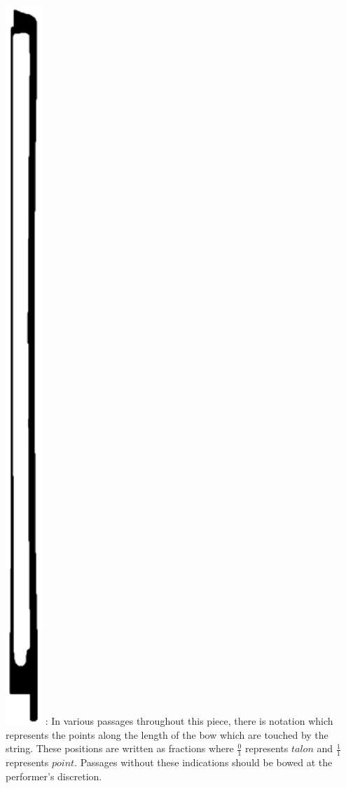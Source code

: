 \documentclass[10pt]{article}
\begin{document}
\begingroup
\begin{center}
 \hspace{0.3mm} \includegraphics[height=0.020\textheight]{bow_position_tablature.eps} \hspace{0.3mm}: In various passages throughout this piece, there is notation which represents the points along the length of the bow which are touched by the string. These positions are written as fractions where \( \frac{0}{1} \) represents $talon$ and \( \frac{1}{1} \) represents $point$. Passages without these indications should be bowed at the performer's discretion.
\rightskip\leftskip
\phantom{text} \hfill \phantom{()}
\end{center}
\endgroup
\end{document}
